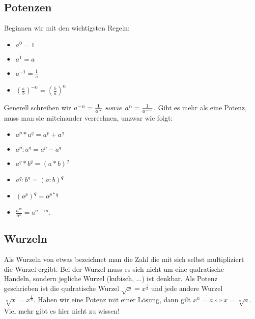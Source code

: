 \documentclass[letterpaper, titlepage]{article}
\begin{document}
\subsection{Potenzen}\label{Potenzen}
Beginnen wir mit den wichtigsten Regeln:
\begin{itemize}
    \item $a^0=1$
    \item $a^1=a$
    \item $a^{-1}=\frac{1}{a}$ 
    \item $(\frac{a}{b})^{-n}=(\frac{b}{a})^n$ 
\end{itemize}

Generell schreiben wir $a^{-n}=\frac{1}{a^n} \hspace{4px} sowie \hspace{4px} a^n=\frac{1}{a^{-n}}$. Gibt es mehr als eine Potenz, muss man sie miteinander verrechnen, unzwar wie folgt:
\begin{itemize}
    \item $a^p * a^q = a^p + a^q$
    \item $a^p : a^q = a^p - a^q$
    \item $a^q * b^q = (a * b)^q$
    \item $a^q : b^q = (a : b)^q$
    \item $(a^p)^q = a^{p*q}$
    \item $\frac{a^m}{a^n}=a^{n-m}$.
\end{itemize}

\subsection{Wurzeln}\label{Wurzeln}
Als Wurzeln von etwas bezeichnet man die Zahl die mit sich selbst multipliziert die Wurzel ergibt. Bei der Wurzel muss es sich nicht um eine qudratische Handeln, sondern jegliche Wurzel (kubisch, ...) ist denkbar. Als Potenz geschrieben ist die qudratische Wurzel $\sqrt{x}=x^{\frac{1}{2}}$ und jede andere Wurzel $\sqrt[n]{x}=x^{\frac{1}{n}}$. Haben wir eine Potenz mit einer Lösung, dann gilt $x^n=a \Leftrightarrow x=\sqrt[n]{a}$. Viel mehr gibt es hier nicht zu wissen!
\end{document}
